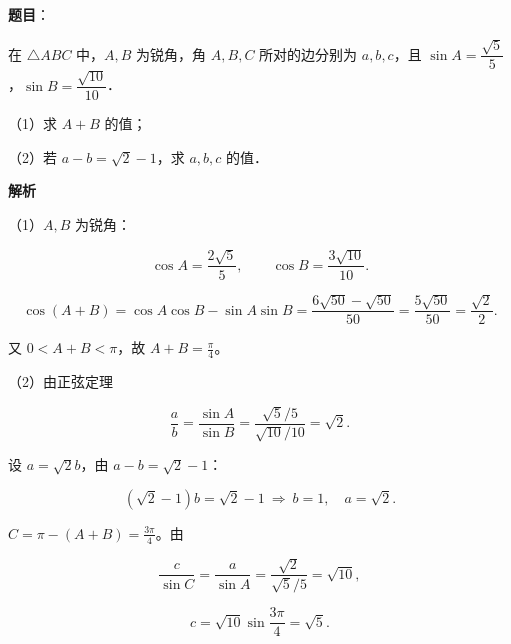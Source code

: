 \begin{answer}

\textbf{题目}：

在 $\triangle ABC$ 中，$A,B$ 为锐角，角 $A,B,C$ 所对的边分别为 $a,b,c$，且 $\sin A=\dfrac{\sqrt5}{5}$，$\sin B=\dfrac{\sqrt{10}}{10}$．

（1）求 $A+B$ 的值；

（2）若 $a-b=\sqrt2-1$，求 $a,b,c$ 的值．

\textbf{解析}

（1）$A,B$ 为锐角：

\nopagebreak[4]
\[\cos A=\frac{2\sqrt5}{5},\qquad \cos B=\frac{3\sqrt{10}}{10}.\]

\nopagebreak[4]
\[\cos(A+B)=\cos A\cos B-\sin A\sin B
=\frac{6\sqrt{50}-\sqrt{50}}{50}
=\frac{5\sqrt{50}}{50}=\frac{\sqrt2}{2}.\]

又 $0<A+B<\pi$，故 $A+B=\frac\pi4$。

（2）由正弦定理

\nopagebreak[4]
\[\frac ab=\frac{\sin A}{\sin B}=\frac{\sqrt5/5}{\sqrt{10}/10}=\sqrt2 .\]

设 $a=\sqrt2b$，由 $a-b=\sqrt2-1$：

\nopagebreak[4]
\[(\sqrt2-1)b=\sqrt2-1\ \Longrightarrow\ b=1,\quad a=\sqrt2 .\]

$C=\pi-(A+B)=\frac{3\pi}{4}$。由

\nopagebreak[4]
\[\frac{c}{\sin C}=\frac{a}{\sin A}=\frac{\sqrt2}{\sqrt5/5}=\sqrt{10},\]

\nopagebreak[4]
\[c=\sqrt{10}\sin\frac{3\pi}{4}=\sqrt5 .\]


\end{answer}
